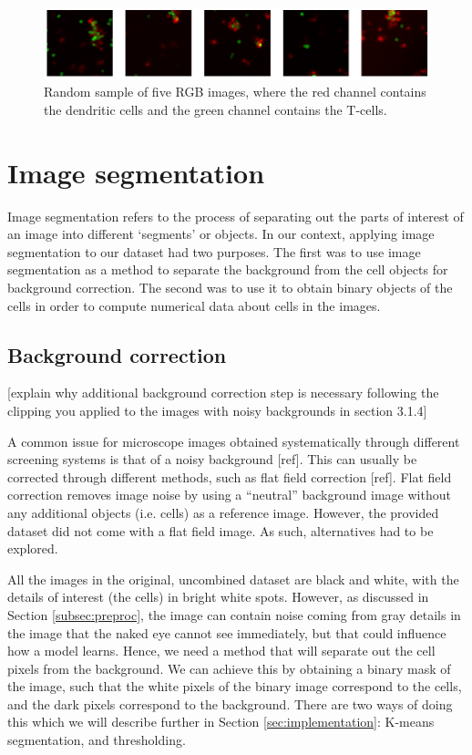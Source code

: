\begin{figure}[h]
    \centering
    \includegraphics[width=\textwidth]{dissertation/figures/combined_cells.png}
    \caption{Random sample of five RGB images, where the red channel contains the dendritic cells and the green channel contains the T-cells.}
    \label{fig:combined}
\end{figure}

\section{Image segmentation}

Image segmentation refers to the process of separating out the parts of interest of an image into different `segments' or objects. In our context, applying image segmentation to our dataset had two purposes. The first was to use image segmentation as a method to separate the background from the cell objects for background correction. The second was to use it to obtain binary objects of the cells in order to compute numerical data about cells in the images.

\subsection{Background correction} \label{subsec:correction}

[explain why additional background correction step is necessary following the clipping you applied to the images with noisy backgrounds in section 3.1.4]

A common issue for microscope images obtained systematically through different screening systems is that of a noisy background [ref]. This can usually be corrected through different methods, such as flat field correction [ref]. Flat field correction removes image noise by using a ``neutral” background image without any additional objects (i.e. cells) as a reference image. However, the provided dataset did not come with a flat field image. As such, alternatives had to be explored.

All the images in the original, uncombined dataset are black and white, with the details of interest (the cells) in bright white spots. However, as discussed in Section \ref{subsec:preproc}, the image can contain noise coming from gray details in the image that the naked eye cannot see immediately, but that could influence how a model learns. Hence, we need a method that will separate out the cell pixels from the background. We can achieve this by obtaining a binary mask of the image, such that the white pixels of the binary image correspond to the cells, and the dark pixels correspond to the background. There are two ways of doing this which we will describe further in Section \ref{sec:implementation}: K-means segmentation, and thresholding.


